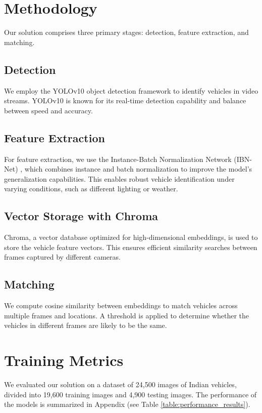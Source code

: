 \documentclass[11pt]{IEEEtran}
\begin{document}
\section{Methodology}
Our solution comprises three primary stages: detection, feature extraction, and
matching.

\subsection{Detection}
We employ the YOLOv10 object detection framework \cite{wang2024yolov10} to
identify vehicles in video streams. YOLOv10 is known for its real-time
detection capability and balance between speed and accuracy.

\subsection{Feature Extraction}
For feature extraction, we use the Instance-Batch Normalization Network
(IBN-Net) \cite{pan2018IBN-Net}, which combines instance and batch
normalization to improve the model's generalization capabilities. This enables
robust vehicle identification under varying conditions, such as different
lighting or weather.

\subsection{Vector Storage with Chroma}
Chroma, a vector database optimized for high-dimensional embeddings, is used to
store the vehicle feature vectors. This ensures efficient similarity searches
between frames captured by different cameras.

\subsection{Matching}
We compute cosine similarity between embeddings to match vehicles across
multiple frames and locations. A threshold is applied to determine whether the
vehicles in different frames are likely to be the same.

\section{Training Metrics}
We evaluated our solution on a dataset of 24,500 images of Indian vehicles,
divided into 19,600 training images and 4,900 testing images. The performance
of the models is summarized in Appendix (see Table
\ref{table:performance_results}).
\end{document}
